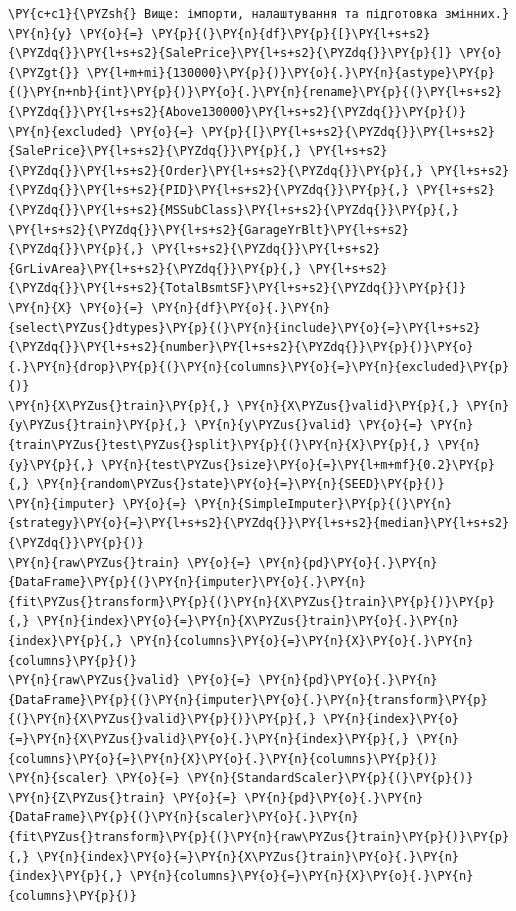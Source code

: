 \begin{Verbatim}[commandchars=\\\{\}]
\PY{c+c1}{\PYZsh{} Вище: імпорти, налаштування та підготовка змінних.}
\PY{n}{y} \PY{o}{=} \PY{p}{(}\PY{n}{df}\PY{p}{[}\PY{l+s+s2}{\PYZdq{}}\PY{l+s+s2}{SalePrice}\PY{l+s+s2}{\PYZdq{}}\PY{p}{]} \PY{o}{\PYZgt{}} \PY{l+m+mi}{130000}\PY{p}{)}\PY{o}{.}\PY{n}{astype}\PY{p}{(}\PY{n+nb}{int}\PY{p}{)}\PY{o}{.}\PY{n}{rename}\PY{p}{(}\PY{l+s+s2}{\PYZdq{}}\PY{l+s+s2}{Above130000}\PY{l+s+s2}{\PYZdq{}}\PY{p}{)}
\PY{n}{excluded} \PY{o}{=} \PY{p}{[}\PY{l+s+s2}{\PYZdq{}}\PY{l+s+s2}{SalePrice}\PY{l+s+s2}{\PYZdq{}}\PY{p}{,} \PY{l+s+s2}{\PYZdq{}}\PY{l+s+s2}{Order}\PY{l+s+s2}{\PYZdq{}}\PY{p}{,} \PY{l+s+s2}{\PYZdq{}}\PY{l+s+s2}{PID}\PY{l+s+s2}{\PYZdq{}}\PY{p}{,} \PY{l+s+s2}{\PYZdq{}}\PY{l+s+s2}{MSSubClass}\PY{l+s+s2}{\PYZdq{}}\PY{p}{,} \PY{l+s+s2}{\PYZdq{}}\PY{l+s+s2}{GarageYrBlt}\PY{l+s+s2}{\PYZdq{}}\PY{p}{,} \PY{l+s+s2}{\PYZdq{}}\PY{l+s+s2}{GrLivArea}\PY{l+s+s2}{\PYZdq{}}\PY{p}{,} \PY{l+s+s2}{\PYZdq{}}\PY{l+s+s2}{TotalBsmtSF}\PY{l+s+s2}{\PYZdq{}}\PY{p}{]}
\PY{n}{X} \PY{o}{=} \PY{n}{df}\PY{o}{.}\PY{n}{select\PYZus{}dtypes}\PY{p}{(}\PY{n}{include}\PY{o}{=}\PY{l+s+s2}{\PYZdq{}}\PY{l+s+s2}{number}\PY{l+s+s2}{\PYZdq{}}\PY{p}{)}\PY{o}{.}\PY{n}{drop}\PY{p}{(}\PY{n}{columns}\PY{o}{=}\PY{n}{excluded}\PY{p}{)}
\PY{n}{X\PYZus{}train}\PY{p}{,} \PY{n}{X\PYZus{}valid}\PY{p}{,} \PY{n}{y\PYZus{}train}\PY{p}{,} \PY{n}{y\PYZus{}valid} \PY{o}{=} \PY{n}{train\PYZus{}test\PYZus{}split}\PY{p}{(}\PY{n}{X}\PY{p}{,} \PY{n}{y}\PY{p}{,} \PY{n}{test\PYZus{}size}\PY{o}{=}\PY{l+m+mf}{0.2}\PY{p}{,} \PY{n}{random\PYZus{}state}\PY{o}{=}\PY{n}{SEED}\PY{p}{)}
\PY{n}{imputer} \PY{o}{=} \PY{n}{SimpleImputer}\PY{p}{(}\PY{n}{strategy}\PY{o}{=}\PY{l+s+s2}{\PYZdq{}}\PY{l+s+s2}{median}\PY{l+s+s2}{\PYZdq{}}\PY{p}{)}
\PY{n}{raw\PYZus{}train} \PY{o}{=} \PY{n}{pd}\PY{o}{.}\PY{n}{DataFrame}\PY{p}{(}\PY{n}{imputer}\PY{o}{.}\PY{n}{fit\PYZus{}transform}\PY{p}{(}\PY{n}{X\PYZus{}train}\PY{p}{)}\PY{p}{,} \PY{n}{index}\PY{o}{=}\PY{n}{X\PYZus{}train}\PY{o}{.}\PY{n}{index}\PY{p}{,} \PY{n}{columns}\PY{o}{=}\PY{n}{X}\PY{o}{.}\PY{n}{columns}\PY{p}{)}
\PY{n}{raw\PYZus{}valid} \PY{o}{=} \PY{n}{pd}\PY{o}{.}\PY{n}{DataFrame}\PY{p}{(}\PY{n}{imputer}\PY{o}{.}\PY{n}{transform}\PY{p}{(}\PY{n}{X\PYZus{}valid}\PY{p}{)}\PY{p}{,} \PY{n}{index}\PY{o}{=}\PY{n}{X\PYZus{}valid}\PY{o}{.}\PY{n}{index}\PY{p}{,} \PY{n}{columns}\PY{o}{=}\PY{n}{X}\PY{o}{.}\PY{n}{columns}\PY{p}{)}
\PY{n}{scaler} \PY{o}{=} \PY{n}{StandardScaler}\PY{p}{(}\PY{p}{)}
\PY{n}{Z\PYZus{}train} \PY{o}{=} \PY{n}{pd}\PY{o}{.}\PY{n}{DataFrame}\PY{p}{(}\PY{n}{scaler}\PY{o}{.}\PY{n}{fit\PYZus{}transform}\PY{p}{(}\PY{n}{raw\PYZus{}train}\PY{p}{)}\PY{p}{,} \PY{n}{index}\PY{o}{=}\PY{n}{X\PYZus{}train}\PY{o}{.}\PY{n}{index}\PY{p}{,} \PY{n}{columns}\PY{o}{=}\PY{n}{X}\PY{o}{.}\PY{n}{columns}\PY{p}{)}

\end{Verbatim}
